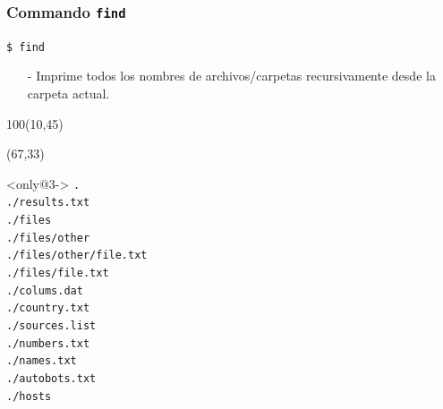 \documentclass{beamer}
\begin{document}
\begin{frame}[fragile,t]
    \frametitle{Commando \texttt{find}}
    \begin{block}{\vspace*{-3ex}}
    \texttt{\$}\verb: find:
    \vspace*{0.5ex}
    \end{block}
    \begin{itemize}
    \item[-] Imprime todos los nombres de archivos/carpetas recursivamente desde la carpeta actual.
    \end{itemize}
    \begin{textblock}{100}(10,45)
    \begin{center}
    \end{center}
    \end{textblock}
    \begin{textblock}{50}(67,33)
    \begin{block}<only@3->{\vspace*{-3ex}}
    \small
    \verb:.:\\
    \verb:./results.txt:\\
    \verb:./files:\\
    \verb:./files/other:\\
    \verb:./files/other/file.txt:\\
    \verb:./files/file.txt:\\
    \verb:./colums.dat:\\
    \verb:./country.txt:\\
    \verb:./sources.list:\\
    \verb:./numbers.txt:\\
    \verb:./names.txt:\\
    \verb:./autobots.txt:\\
    \verb:./hosts:
    \vspace*{0.5ex}
    \end{block}
    \end{textblock} 
\end{frame}
\end{document}
